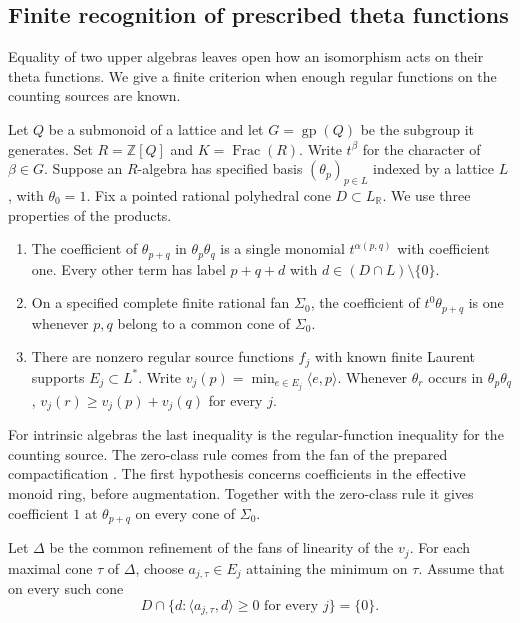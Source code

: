 \documentclass[11pt,reqno]{amsart}
\numberwithin{equation}{section}
\theoremstyle{definition}
\theoremstyle{remark}
\DeclareMathOperator{\Frac}{Frac}
\begin{document}
\subsection{Finite recognition of prescribed theta functions}
\label{subsec:prescribed-recognition}

Equality of two upper algebras leaves open how an isomorphism acts on
their theta functions. We give a finite criterion when enough regular
functions on the counting sources are known.

Let \(Q\) be a submonoid of a lattice and let \(G=\operatorname{gp}(Q)\)
be the subgroup it generates. Set
\(R=\mathbb Z[Q]\) and \(K=\Frac(R)\). Write \(t^\beta\)
for the character of \(\beta\in G\). Suppose an \(R\)-algebra has
specified basis \((\theta_p)_{p\in L}\) indexed by a lattice \(L\),
with \(\theta_0=1\). Fix a pointed rational polyhedral cone
\(D\subset L_{\mathbb R}\). We use three properties of the products.
\begin{enumerate}
\item The coefficient of \(\theta_{p+q}\) in
  \(\theta_p\theta_q\) is a single monomial \(t^{\alpha(p,q)}\) with
  coefficient one. Every other term has label \(p+q+d\) with
  \(d\in (D\cap L)\setminus\{0\}\).
\item On a specified complete finite rational fan \(\Sigma_0\), the
  coefficient of \(t^0\theta_{p+q}\) is one whenever \(p,q\) belong
  to a common cone of \(\Sigma_0\).
\item There are nonzero regular source functions \(f_j\) with known
  finite Laurent supports \(E_j\subset L^*\). Write
  \(v_j(p)=\min_{e\in E_j}\langle e,p\rangle\).
  Whenever \(\theta_r\) occurs in \(\theta_p\theta_q\),
  \(v_j(r)\ge v_j(p)+v_j(q)\) for every \(j\).
\end{enumerate}
For intrinsic algebras the last inequality is the regular-function
inequality for the counting source. The zero-class rule comes from the
fan of the prepared compactification
\cite[Theorem~15.7 and Proposition~15.12]{KY}.
The first hypothesis concerns coefficients in the effective monoid
ring, before augmentation. Together with the zero-class rule it gives
coefficient \(1\) at \(\theta_{p+q}\) on every cone of \(\Sigma_0\).

Let \(\Delta\) be the common refinement of the fans of linearity of
the \(v_j\). For each maximal cone \(\tau\) of \(\Delta\), choose
\(a_{j,\tau}\in E_j\) attaining the minimum on \(\tau\).
Assume that on every such cone
\[ D\cap\{d:\langle a_{j,\tau},d\rangle\ge0 \text{ for every }j\}=\{0\}. \]
\end{document}
